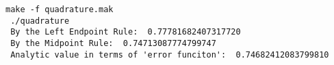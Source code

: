 \begin{Verbatim}[frame=lines,label=quadrature - commands and output]
 make -f quadrature.mak
 ./quadrature
 By the Left Endpoint Rule:  0.77781682407317720     
 By the Midpoint Rule:  0.74713087774799747     
 Analytic value in terms of 'error funciton':  0.74682412083799810
\end{Verbatim}
